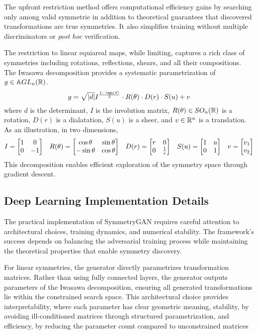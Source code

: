     The upfront restriction method offers computational efficiency gains by searching only among valid symmetrie in addition to theoretical guarantees that discovered transformations are true symmetries.
    It also simplifies training without multiple discriminators or \textit{post hoc} verification.

    The restriction to linear equiareal maps, while limiting, captures a rich class of symmetries including rotations, reflections, shears, and all their compositions.
    The Iwasawa decomposition\kd{} provides a systematic parametrization of \(g\in\mathbb{A}GL_n(\mathbb{R})\).
    \[
        g = \sqrt{|d|} I^{\frac{1-\sgn(d)}{2}} \cdot R(\theta) \cdot D(r) \cdot S(u) + v
    \]
    where \(d\) is the determinant, \(I\) is the involution matrix, \(R(\theta)\in SO_n(\mathbb{R})\) is a rotation, \(D(r)\) is a dialatation, \(S(u)\) is a sheer, and \(v\in\mathbb{R}^n\) is a translation.
    As an illustration, in two dimensions,
    \[
        I = \mqty[1&0\\0&-1] \quad R(\theta) = \mqty[\cos\theta&\sin\theta\\-\sin\theta&\cos\theta] \quad D(r) = \mqty[r&0\\0&\frac1r] \quad S(u) = \mqty[1 & u\\0&1]\quad v = \mqty[v_1\\v_2]
    \]
    This decomposition enables efficient exploration of the symmetry space through gradient descent.

    \subsection{Deep Learning Implementation Details}
    The practical implementation of SymmetryGAN requires careful attention to architectural choices, training dynamics, and numerical stability.
    The framework's success depends on balancing the adversarial training process while maintaining the theoretical properties that enable symmetry discovery.
    
    For linear symmetries, the generator directly parametrizes transformation matrices.
    Rather than using fully connected layers, the generator outputs parameters of the Iwasawa decomposition, ensuring all generated transformations lie within the constrained search space.
    This architectural choice provides interpretability, where each parameter has clear geometric meaning, stability, by avoiding ill-conditioned matrices through structured parametrization, and efficiency, by reducing the parameter count compared to unconstrained matrices

